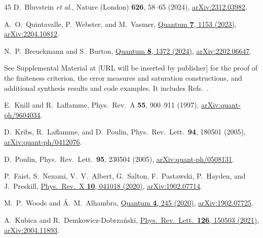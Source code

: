 \documentclass[aps,prl,reprint,notitlepage,nofootinbib,nobibnotes]{revtex4-2}
\begin{document}
\begin{thebibliography}{45}
D.~Bluvstein \emph{et al.},
Nature (London) \textbf{626}, 58--65 (2024),
\href{https://arxiv.org/abs/2312.03982}{arXiv:2312.03982}.

A.~O.~Quintavalle, P.~Webster, and M.~Vasmer,
\href{https://quantum-journal.org/papers/q-2023-10-24-1153/}{Quantum \textbf{7}, 1153 (2023)},
\href{https://arxiv.org/abs/2204.10812}{arXiv:2204.10812}.

N.~P.~Breuckmann and S.~Burton,
\href{https://quantum-journal.org/papers/q-2024-06-13-1372/}{Quantum \textbf{8}, 1372 (2024)},
\href{https://arxiv.org/abs/2202.06647}{arXiv:2202.06647}.

See Supplemental Material at [URL will be inserted by publisher] for the proof of the finiteness
criterion, the error measures and saturation constructions, and additional synthesis results and
code examples. It includes Refs.~\cite{Stacks,Schumacher,FletcherShorWin,NielsenAverage,%
  KuengMetrics,BaconCasaccino,BravyiKitaev,Horsman,PaetznickReichardt,%
  BombinGauge,Barenco,Shende,Bacon}.

E.~Knill and R.~Laflamme,
Phys.\ Rev.\ A \textbf{55}, 900--911 (1997),
\href{https://arxiv.org/abs/quant-ph/9604034}{arXiv:quant-ph/9604034}.

D.~Kribs, R.~Laflamme, and D.~Poulin,
Phys.\ Rev.\ Lett.\ \textbf{94}, 180501 (2005),
\href{https://arxiv.org/abs/quant-ph/0412076}{arXiv:quant-ph/0412076}.

D.~Poulin,
Phys.\ Rev.\ Lett.\ \textbf{95}, 230504 (2005),
\href{https://arxiv.org/abs/quant-ph/0508131}{arXiv:quant-ph/0508131}.

P.~Faist, S.~Nezami, V.~V.~Albert, G.~Salton, F.~Pastawski,
P.~Hayden, and J.~Preskill,
\href{https://link.aps.org/doi/10.1103/PhysRevX.10.041018}{Phys.\ Rev.\ X \textbf{10}, 041018
(2020)},
\href{https://arxiv.org/abs/1902.07714}{arXiv:1902.07714}.

M.~P.~Woods and \'A.~M.~Alhambra,
\href{https://quantum-journal.org/papers/q-2020-03-23-245/}{Quantum \textbf{4}, 245 (2020)},
\href{https://arxiv.org/abs/1902.07725}{arXiv:1902.07725}.

A.~Kubica and R.~Demkowicz-Dobrza\'nski,
\href{https://link.aps.org/doi/10.1103/PhysRevLett.126.150503}{Phys.\ Rev.\ Lett.\ \textbf{126},
150503 (2021)},
\href{https://arxiv.org/abs/2004.11893}{arXiv:2004.11893}.


\end{thebibliography}
\end{document}
